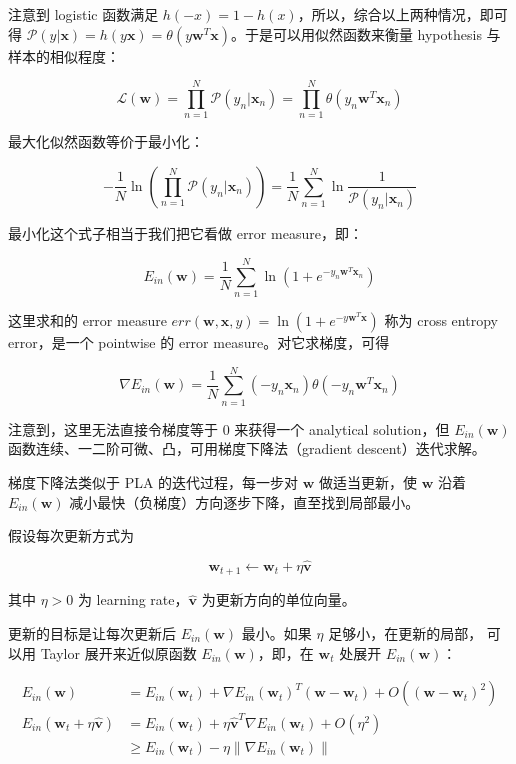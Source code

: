 \documentclass[a4paper]{article}
\begin{document}
注意到 logistic 函数满足 $h(-x) = 1 - h(x)$，所以，综合以上两种情况，即可得 $\mathcal{P}(y|\mathbf{x}) = h(y\mathbf{x}) = \theta(y\mathbf{w}^T\mathbf{x})$。于是可以用似然函数来衡量 hypothesis 与样本的相似程度：

$$\mathcal{L}(\mathbf{w}) = \prod_{n=1}^{N}\mathcal{P}(y_n|\mathbf{x}_n) = \prod_{n=1}^{N}\theta(y_n\mathbf{w}^T\mathbf{x}_n)$$

最大化似然函数等价于最小化：

$$-\frac{1}{N} \ln \left (  \prod_{n=1}^{N} \mathcal{P}(y_n|\mathbf{x}_n) \right ) = \frac{1}{N} \sum_{n=1}^{N} \ln\frac{1}{\mathcal{P}(y_n|\mathbf{x}_n)}$$

最小化这个式子相当于我们把它看做 error measure，即：

$$E_{in}(\mathbf{w}) = \frac{1}{N}\sum_{n=1}^{N}\ln(1 + e^{-y_n\mathbf{w}^T\mathbf{x}_n})$$

这里求和的 error measure $err(\mathbf{w}, \mathbf{x}, y) = \ln(1 + e^{-y\mathbf{w}^T\mathbf{x}})$ 称为 cross entropy error，是一个 pointwise 的 error measure。对它求梯度，可得

$$\nabla E_{in}(\mathbf{w}) = \frac{1}{N}\sum_{n=1}^{N}(-y_n\mathbf{x}_n) \theta(-y_n\mathbf{w}^T\mathbf{x}_n)$$

注意到，这里无法直接令梯度等于 $0$ 来获得一个 analytical solution，但 $E_{in}(\mathbf{w})$ 函数连续、一二阶可微、凸，可用梯度下降法（gradient descent）迭代求解。

梯度下降法类似于 PLA 的迭代过程，每一步对 $\mathbf{w}$ 做适当更新，使 $\mathbf{w}$ 沿着 $E_{in}(\mathbf{w})$ 减小最快（负梯度）方向逐步下降，直至找到局部最小。

假设每次更新方式为

$$\mathbf{w}_{t+1} \leftarrow \mathbf{w}_t + \eta\hat{\mathbf{v}}$$

其中 $\eta > 0$ 为 learning rate，$\hat{\mathbf{v}}$ 为更新方向的单位向量。

更新的目标是让每次更新后 $E_{in}(\mathbf{w})$ 最小。如果 $\eta$ 足够小，在更新的局部，
可以用 Taylor 展开来近似原函数 $E_{in}(\mathbf{w})$，即，在 $\mathbf{w}_t$ 处展开 $E_{in}(\mathbf{w})$：

\begin{equation}
\begin{aligned}
E_{in}(\mathbf{w}) &= E_{in}(\mathbf{w}_t) + \nabla E_{in}(\mathbf{w}_t)^T(\mathbf{w} - \mathbf{w}_t) + O((\mathbf{w} - \mathbf{w}_t)^2)\\
E_{in}(\mathbf{w}_t + \eta\hat{\mathbf{v}}) &= E_{in}(\mathbf{w}_t) + \eta\hat{\mathbf{v}}^T\nabla E_{in}(\mathbf{w}_t) + O(\eta^2) \\
                   &\ge E_{in}(\mathbf{w}_t) - \eta\|\nabla E_{in}(\mathbf{w}_t)\|
\end{aligned}
\end{equation}
\end{document}
